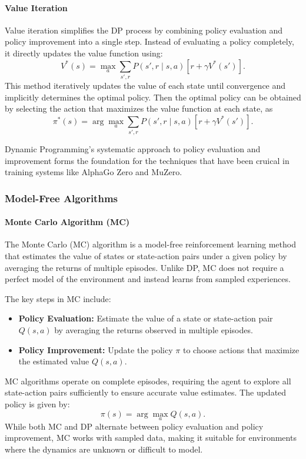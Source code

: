 \paragraph{Value Iteration}
Value iteration simplifies the DP process by combining policy evaluation and
policy improvement into a single step. Instead of evaluating a policy
completely, it directly updates the value function using:
\[
    V^*(s) = \max_a \sum_{s', r} P(s', r \mid s, a) \left[ r + \gamma V^*(s') \right].
\]
This method iteratively updates the value of each state until convergence and
implicitly determines the optimal policy. Then the optimal policy can be
obtained by selecting the action that maximizes the value function at each
state, as
\begin{equation}
    \pi^*(s) = \arg\max_a \sum_{s', r} P(s', r \mid s, a) \left[ r + \gamma V^*(s') \right].
\end{equation}

Dynamic Programming's systematic approach to policy evaluation and improvement
forms the foundation for the techniques that have been cruical in training
systems like AlphaGo Zero and MuZero.

\subsubsection{\textbf{Model-Free Algorithms}}

\paragraph{Monte Carlo Algorithm (MC)}
The Monte Carlo (MC) algorithm is a model-free reinforcement learning method
that estimates the value of states or state-action pairs under a given policy
by averaging the returns of multiple episodes. Unlike DP, MC does not require a
perfect model of the environment and instead learns from sampled experiences.

The key steps in MC include:

\begin{itemize}
    \item \textbf{Policy Evaluation:} Estimate the value of a state or state-action pair \( Q(s, a) \) by averaging the returns observed in multiple episodes.
    \item \textbf{Policy Improvement:} Update the policy \( \pi \) to choose actions that maximize the estimated value \( Q(s, a) \).
\end{itemize}

MC algorithms operate on complete episodes, requiring the agent to explore all
state-action pairs sufficiently to ensure accurate value estimates. The updated
policy is given by:
\[
    \pi(s) = \arg\max_a Q(s, a).
\]
While both MC and DP alternate between policy evaluation and policy
improvement, MC works with sampled data, making it suitable for environments
where the dynamics are unknown or difficult to model.

